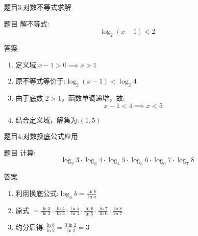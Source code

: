   
  
  \begin{frame}{题目3:对数不等式求解}
    \begin{block}{题目}
        解不等式:
        \[
        \log_2 (x - 1) < 2
        \]
    \end{block}
    
    \pause
    
    \begin{block}{答案}
        \begin{enumerate}
            \item 定义域:$x - 1 > 0 \implies x > 1$
            \item 原不等式等价于:$\log_2 (x - 1) < \log_2 4$
            \item 由于底数 $2 > 1$，函数单调递增，故:
                  \[
                  x - 1 < 4 \implies x < 5
                  \]
            \item 结合定义域，解集为:$(1, 5)$
        \end{enumerate}
    \end{block}
  \end{frame}
  
  
  
  \begin{frame}{题目4:对数换底公式应用}
    \begin{block}{题目}
        计算:
        \[
        \log_2 3 \cdot \log_3 4 \cdot \log_4 5 \cdot \log_5 6 \cdot \log_6 7 \cdot \log_7 8
        \]
    \end{block}
    
    \pause
    
    \begin{block}{答案}
        \begin{enumerate}
            \item 利用换底公式:$\log_a b = \frac{\ln b}{\ln a}$
            \item 原式 $= \frac{\ln 3}{\ln 2} \cdot \frac{\ln 4}{\ln 3} \cdot \frac{\ln 5}{\ln 4} \cdot \frac{\ln 6}{\ln 5} \cdot \frac{\ln 7}{\ln 6} \cdot \frac{\ln 8}{\ln 7}$
            \item 约分后得:$\frac{\ln 8}{\ln 2} = \frac{3\ln 2}{\ln 2} = 3$
        \end{enumerate}
    \end{block}
  \end{frame}
  
